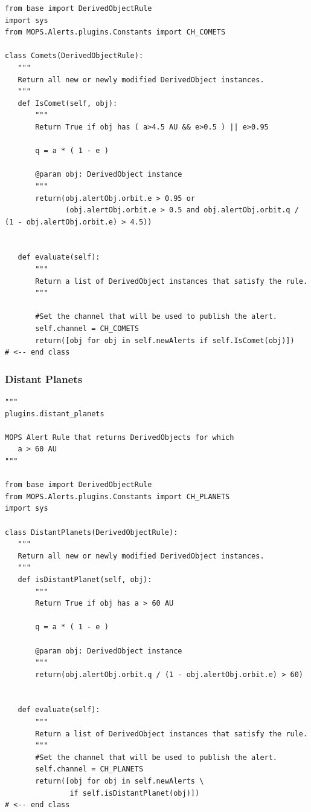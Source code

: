 \documentclass[panstarrs]{panstarrs}
\begin{document}
\begin{appendices}
\begin{verbatim}
from base import DerivedObjectRule
import sys
from MOPS.Alerts.plugins.Constants import CH_COMETS

class Comets(DerivedObjectRule):
   """
   Return all new or newly modified DerivedObject instances.
   """
   def IsComet(self, obj):
       """
       Return True if obj has ( a>4.5 AU && e>0.5 ) || e>0.95

       q = a * ( 1 - e )

       @param obj: DerivedObject instance
       """
       return(obj.alertObj.orbit.e > 0.95 or
              (obj.alertObj.orbit.e > 0.5 and obj.alertObj.orbit.q / (1 - obj.alertObj.orbit.e) > 4.5))

   
   def evaluate(self):
       """
       Return a list of DerivedObject instances that satisfy the rule.
       """
       
       #Set the channel that will be used to publish the alert.
       self.channel = CH_COMETS
       return([obj for obj in self.newAlerts if self.IsComet(obj)])
# <-- end class
\end{verbatim}

\subsubsection{Distant Planets}
\begin{verbatim}
"""
plugins.distant_planets

MOPS Alert Rule that returns DerivedObjects for which
   a > 60 AU
"""

from base import DerivedObjectRule
from MOPS.Alerts.plugins.Constants import CH_PLANETS
import sys

class DistantPlanets(DerivedObjectRule):
   """
   Return all new or newly modified DerivedObject instances.
   """
   def isDistantPlanet(self, obj):
       """
       Return True if obj has a > 60 AU

       q = a * ( 1 - e )

       @param obj: DerivedObject instance
       """
       return(obj.alertObj.orbit.q / (1 - obj.alertObj.orbit.e) > 60)

   
   def evaluate(self):
       """
       Return a list of DerivedObject instances that satisfy the rule.
       """
       #Set the channel that will be used to publish the alert.
       self.channel = CH_PLANETS
       return([obj for obj in self.newAlerts \
               if self.isDistantPlanet(obj)])
# <-- end class
\end{verbatim}


\end{appendices}
\end{document}

